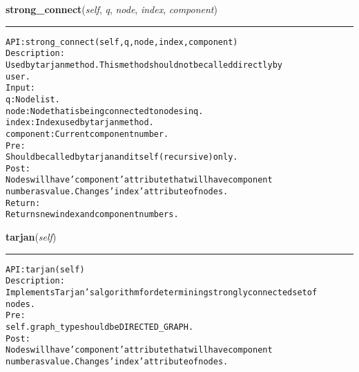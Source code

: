     \label{coinor:gimpy:graph:Graph:strong_connect}

    \vspace{0.5ex}

\hspace{.8\funcindent}\begin{boxedminipage}{\funcwidth}

    \raggedright \textbf{strong\_connect}(\textit{self}, \textit{q}, \textit{node}, \textit{index}, \textit{component})

    \vspace{-1.5ex}

    \rule{\textwidth}{0.5\fboxrule}
\setlength{\parskip}{2ex}
\begin{alltt}

API: strong\_connect (self, q, node, index, component)
Description:
Used by tarjan method. This method should not be called directly by
user.
Input:
    q: Node list.
    node: Node that is being connected to nodes in q.
    index: Index used by tarjan method.
    component: Current component number.
Pre:
    Should be called by tarjan and itself (recursive) only.
Post:
    Nodes will have 'component' attribute that will have component
    number as value. Changes 'index' attribute of nodes.
Return:
    Returns new index and component numbers.
\end{alltt}

\setlength{\parskip}{1ex}
    \end{boxedminipage}

    \label{coinor:gimpy:graph:Graph:tarjan}

    \vspace{0.5ex}

\hspace{.8\funcindent}\begin{boxedminipage}{\funcwidth}

    \raggedright \textbf{tarjan}(\textit{self})

    \vspace{-1.5ex}

    \rule{\textwidth}{0.5\fboxrule}
\setlength{\parskip}{2ex}
\begin{alltt}

API: tarjan(self)
Description:
Implements Tarjan's algorithm for determining strongly connected set of
nodes.
Pre:
    self.graph\_type should be DIRECTED\_GRAPH.
Post:
    Nodes will have 'component' attribute that will have component
    number as value. Changes 'index' attribute of nodes.
\end{alltt}

\setlength{\parskip}{1ex}
    \end{boxedminipage}

